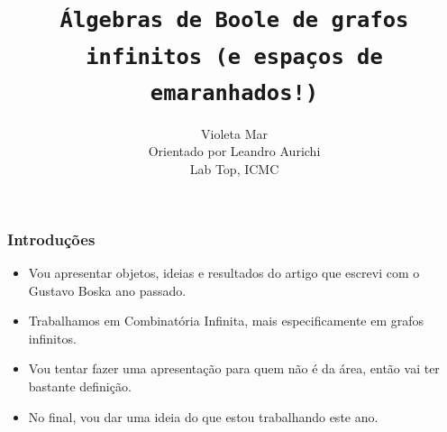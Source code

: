 \newcommand{\slidemode}{1}


\title{\texttt{Álgebras de Boole de grafos infinitos (e espaços de emaranhados!)}}
\author{Violeta Mar\\ Orientado por Leandro Aurichi \\ Lab Top, ICMC}
\date{}




\begin{frame}{}
\maketitle
\end{frame}

\begin{frame}{}
\frametitle{Introduções}
    \begin{itemize}
        \item Vou apresentar objetos, ideias e resultados do artigo que escrevi com o Gustavo Boska ano passado. \pause
        \item Trabalhamos em Combinatória Infinita, mais especificamente em grafos infinitos. \pause
        \item Vou tentar fazer uma apresentação para quem não é da área, então vai ter bastante definição. \pause
        \item No final, vou dar uma ideia do que estou trabalhando este ano. 
    \end{itemize}
\end{frame}

